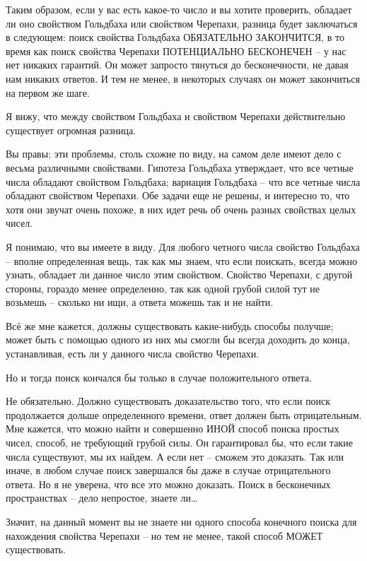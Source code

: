 \documentclass[../main.tex]{subfiles}
\begin{document}
\begin{dialogue}
 Таким образом, если у вас есть какое-то число и вы хотите проверить, обладает ли оно свойством Гольдбаха или свойством Черепахи, разница будет заключаться в следующем: поиск свойства Гольдбаха ОБЯЗАТЕЛЬНО ЗАКОНЧИТСЯ, в то время как поиск свойства Черепахи ПОТЕНЦИАЛЬНО БЕСКОНЕЧЕН \--- у нас нет никаких гарантий. Он может запросто тянуться до бесконечности, не давая нам никаких ответов. И тем не менее, в некоторых случаях он может закончиться на первом же шаге.

 Я вижу, что между свойством Гольдбаха и свойством Черепахи действительно существует огромная разница.

 Вы правы; эти проблемы, столь схожие по виду, на самом деле имеют дело с весьма различными свойствами. Гипотеза Гольдбаха утверждает, что все четные числа обладают свойством Гольдбаха; вариация Гольдбаха \--- что все четные числа обладают свойством Черепахи. Обе задачи еще не решены, и интересно то, что хотя они звучат очень похоже, в них идет речь об очень разных свойствах целых чисел.

 Я понимаю, что вы имеете в виду. Для любого четного числа свойство Гольдбаха \--- вполне определенная вещь, так как мы знаем, что если поискать, всегда можно узнать, обладает ли данное число этим свойством. Свойство Черепахи, с другой стороны, гораздо менее определенно, так как одной грубой силой тут не возьмешь \--- сколько ни ищи, а ответа можешь так и не найти.

 Всё же мне кажется, должны существовать какие-нибудь способы получше; может быть с помощью одного из них мы смогли бы всегда доходить до конца, устанавливая, есть ли у данного числа свойство Черепахи.

 Но и тогда поиск кончался бы только в случае положительного ответа.

 Не обязательно. Должно существовать доказательство того, что если поиск продолжается дольше определенного времени, ответ должен быть отрицательным. Мне кажется, что можно найти и совершенно ИНОЙ способ поиска простых чисел, способ, не требующий грубой силы. Он гарантировал бы, что если такие числа существуют, мы их найдем. А если нет \--- сможем это доказать. Так или иначе, в любом случае поиск завершался бы даже в случае отрицательного ответа. Но я не уверена, что все это можно доказать. Поиск в бесконечных пространствах \--- дело непростое, знаете ли\ldots{}

 Значит, на данный момент вы не знаете ни одного способа конечного поиска для нахождения свойства Черепахи \--- но тем не менее, такой способ МОЖЕТ существовать.


\end{dialogue}
\end{document}
